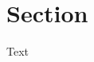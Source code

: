 \documentclass{article}
\begin{document}
\section{Section}
Text \cite{knuth_fa}

\printbibliography
\end{document}
